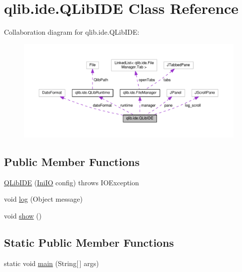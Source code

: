 \hypertarget{classqlib_1_1ide_1_1QLibIDE}{}\section{qlib.\+ide.\+Q\+Lib\+I\+DE Class Reference}
\label{classqlib_1_1ide_1_1QLibIDE}


Collaboration diagram for qlib.\+ide.\+Q\+Lib\+I\+DE\+:\nopagebreak
\begin{figure}[H]
\begin{center}
\leavevmode
\includegraphics[width=350pt]{classqlib_1_1ide_1_1QLibIDE__coll__graph}
\end{center}
\end{figure}
\subsection*{Public Member Functions}
\begin{DoxyCompactItemize}
\item 
\hyperlink{classqlib_1_1ide_1_1QLibIDE_a3eafdf56320c066383975e5b2d22503a}{Q\+Lib\+I\+DE} (\hyperlink{classqlib_1_1ide_1_1IniIO}{Ini\+IO} config)  throws I\+O\+Exception
\item 
void \hyperlink{classqlib_1_1ide_1_1QLibIDE_aa0b95da9f912317b1497e190748733d6}{log} (Object message)
\item 
void \hyperlink{classqlib_1_1ide_1_1QLibIDE_a53bc0b691fd24d3e2dad2603cf086760}{show} ()
\end{DoxyCompactItemize}
\subsection*{Static Public Member Functions}
\begin{DoxyCompactItemize}
\item 
static void \hyperlink{classqlib_1_1ide_1_1QLibIDE_a4d8a71cb808c1796b48f83b05e3ca1b8}{main} (String\mbox{[}$\,$\mbox{]} args)
\end{DoxyCompactItemize}
